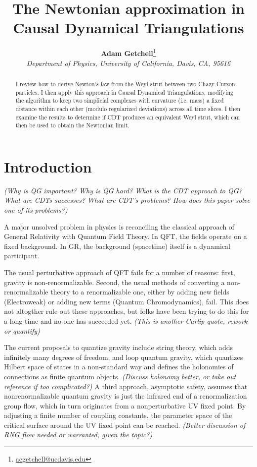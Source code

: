 \documentclass[12pt]{article}
\title{The Newtonian approximation in Causal Dynamical Triangulations}
\author{\textbf{Adam Getchell}\footnote{\href{mailto:acgetchell@ucdavis.edu}{acgetchell@ucdavis.edu}}\\\textit{Department of Physics, University of California, Davis, CA, 95616}}
\begin{document}
\maketitle

\begin{abstract}
I review how to derive Newton's law from the Weyl strut between two Chazy-Curzon particles. I then apply this approach in Causal Dynamical Triangulations, modifying the algorithm to keep two simplicial complexes with curvature (i.e. mass) a fixed distance within each other (modulo regularized deviations) across all time slices. I then examine the results to determine if CDT produces an equivalent Weyl strut, which can then be used to obtain the Newtonian limit.
\end{abstract}

\section{Introduction}

\textit{(Why is QG important? Why is QG hard? What is the CDT approach to QG? What are CDTs successes? What are CDT's problems? How does this paper solve one of its problems?)}

A major unsolved problem in physics is reconciling the classical approach of General Relativity with Quantum Field Theory. In QFT, the fields operate on a fixed background. In GR, the background (spacetime) itself is a dynamical participant.

The usual perturbative approach of QFT fails for a number of reasons: first, gravity is non-renormalizable. Second, the usual methods of converting a non-renormalizable theory to a renormalizable one, either by adding new fields (Electroweak) or adding new terms (Quantum Chromodynamics), fail. This does not altogther rule out these approaches, but folks have been trying to do this for a long time and no one has succeeded yet. \textit{(This is another Carlip quote, rework or quantify)}

The current proposals to quantize gravity include string theory, which adds infinitely many degrees of freedom, and loop quantum gravity, which quantizes Hilbert space of states in a non-standard way and defines the holonomies of connections as finite quantum objects. \textit{(Discuss holonomy better, or take out reference if too complicated?)} A third approach, asymptotic safety, assumes that nonrenormalizable quantum gravity is just the infrared end of a renormalization group flow, which in turn originates from a nonperturbative UV fixed point. By adjusting a finite number of coupling constants, the parameter space of the critical surface around the UV fixed point can be reached. \textit{(Better discussion of RNG flow needed or warranted, given the topic?)}
\end{document}
